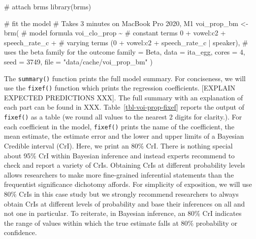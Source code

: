 \documentclass[
  authoryear,
  preprint,
  3p]{elsarticle}
\newenvironment{Shaded}{\begin{snugshade}}{\end{snugshade}}
\newcommand{\AttributeTok}[1]{\textcolor[rgb]{0.40,0.45,0.13}{#1}}
\newcommand{\CommentTok}[1]{\textcolor[rgb]{0.37,0.37,0.37}{#1}}
\newcommand{\DecValTok}[1]{\textcolor[rgb]{0.68,0.00,0.00}{#1}}
\newcommand{\FunctionTok}[1]{\textcolor[rgb]{0.28,0.35,0.67}{#1}}
\newcommand{\NormalTok}[1]{\textcolor[rgb]{0.00,0.23,0.31}{#1}}
\newcommand{\OtherTok}[1]{\textcolor[rgb]{0.00,0.23,0.31}{#1}}
\newcommand{\SpecialCharTok}[1]{\textcolor[rgb]{0.37,0.37,0.37}{#1}}
\newcommand{\StringTok}[1]{\textcolor[rgb]{0.13,0.47,0.30}{#1}}
\begin{document}
\begin{Shaded}
\begin{Highlighting}[]
\CommentTok{\# attach brms}
\FunctionTok{library}\NormalTok{(brms)}

\CommentTok{\# fit the model}
\CommentTok{\# Takes 3 minutes on MacBook Pro 2020, M1}
\NormalTok{voi\_prop\_bm }\OtherTok{\textless{}{-}} \FunctionTok{brm}\NormalTok{(}
  \CommentTok{\# model formula}
\NormalTok{  voi\_clo\_prop }\SpecialCharTok{\textasciitilde{}}
    \CommentTok{\# constant terms}
    \DecValTok{0} \SpecialCharTok{+}\NormalTok{ vowel}\SpecialCharTok{:}\NormalTok{c2 }\SpecialCharTok{+}\NormalTok{ speech\_rate\_c }\SpecialCharTok{+}
    \CommentTok{\# varying terms}
\NormalTok{    (}\DecValTok{0} \SpecialCharTok{+}\NormalTok{ vowel}\SpecialCharTok{:}\NormalTok{c2 }\SpecialCharTok{+}\NormalTok{ speech\_rate\_c }\SpecialCharTok{|}\NormalTok{ speaker),}
  \CommentTok{\# uses the beta family for the outcome}
  \AttributeTok{family =}\NormalTok{ Beta,}
  \AttributeTok{data =}\NormalTok{ ita\_egg,}
  \AttributeTok{cores =} \DecValTok{4}\NormalTok{,}
  \AttributeTok{seed =} \DecValTok{3749}\NormalTok{,}
  \AttributeTok{file =} \StringTok{"data/cache/voi\_prop\_bm"}
\NormalTok{)}
\end{Highlighting}
\end{Shaded}

The \texttt{summary()} function prints the full model summary. For
conciseness, we will use the \texttt{fixef()} function which prints the
regression coefficients. {[}EXPLAIN EXPECTED PREDICTIONS XXX{]}. The
full summary with an explanation of each part can be found in XXX.
Table~\ref{tbl-voi-prop-fixef} reports the output of \texttt{fixef()} as
a table (we round all values to the nearest 2 digits for clarity.). For
each coefficient in the model, \texttt{fixef()} prints the name of the
coefficient, the mean estimate, the estimate error and the lower and
upper limits of a Bayesian Credible interval (CrI). Here, we print an
80\% CrI. There is nothing special about 95\% CrI within Bayesian
inference and instead experts recommend to check and report a variety of
CrIs. Obtaining CrIs at different probability levels allows researchers
to make more fine-grained inferential statements than the frequentist
significance dichotomy affords. For simplicity of exposition, we will
use 80\% CrIs in this case study but we strongly recommend researchers
to always obtain CrIs at different levels of probability and base their
inferences on all and not one in particular. To reiterate, in Bayesian
inference, an 80\% CrI indicates the range of values within which the
true estimate falls at 80\% probability or confidence.
\end{document}
